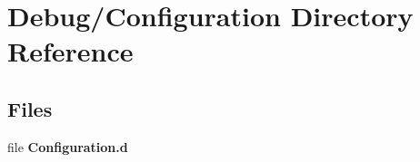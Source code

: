 \section{Debug/\+Configuration Directory Reference}
\label{dir_347891f9240866b77896fc59ef53d98c}
\subsection*{Files}
\begin{DoxyCompactItemize}
\item 
file {\bfseries Configuration.\+d}
\end{DoxyCompactItemize}
